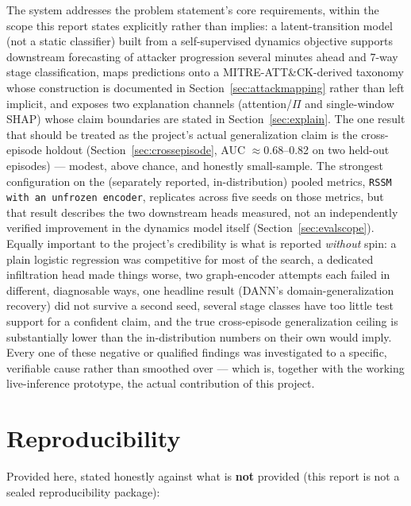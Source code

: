 \documentclass[11pt]{article}
\newcommand{\code}[1]{\texttt{#1}}
\begin{document}
The system addresses the problem statement's core requirements, within the scope this report
states explicitly rather than implies: a latent-transition model (not a static classifier)
built from a self-supervised dynamics objective supports downstream forecasting of attacker
progression several minutes ahead and 7-way stage classification, maps predictions onto a
MITRE-ATT\&CK-derived taxonomy whose construction is documented in
Section~\ref{sec:attackmapping} rather than left implicit, and exposes two explanation
channels (attention/$\Pi$ and single-window SHAP) whose claim boundaries are stated in
Section~\ref{sec:explain}. The one result that should be treated as the project's actual
generalization claim is the cross-episode holdout (Section~\ref{sec:crossepisode}, AUC
$\approx$0.68--0.82 on two held-out episodes) --- modest, above chance, and honestly small-sample.
The strongest configuration on the (separately reported, in-distribution) pooled metrics,
\code{RSSM with an unfrozen encoder}, replicates across five seeds on those metrics, but that
result describes the two downstream heads measured, not an independently verified improvement
in the dynamics model itself (Section~\ref{sec:evalscope}). Equally important to the project's
credibility is what is reported \emph{without} spin: a plain logistic regression was
competitive for most of the search, a dedicated infiltration head made things worse, two
graph-encoder attempts each failed in different, diagnosable ways, one headline result
(DANN's domain-generalization recovery) did not survive a second seed, several stage classes
have too little test support for a confident claim, and the true cross-episode generalization
ceiling is substantially lower than the in-distribution numbers on their own would imply.
Every one of these negative or
qualified findings was investigated to a specific, verifiable cause rather than smoothed over
--- which is, together with the working live-inference prototype, the actual contribution of
this project.

\section*{Reproducibility}

Provided here, stated honestly against what is \textbf{not} provided (this report is not a
sealed reproducibility package):
\end{document}
